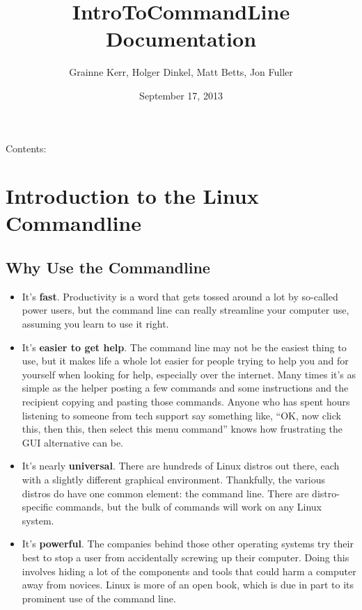 \documentclass[letterpaper,10pt,english]{sphinxmanual}
\title{IntroToCommandLine Documentation}
\date{September 17, 2013}
\author{Grainne Kerr, Holger Dinkel, Matt Betts, Jon Fuller}
\begin{document}
\maketitle
\tableofcontents
{}\label{IntroToCommandLine::doc}


Contents:


\chapter{Introduction to the Linux Commandline}
\label{introduction:welcome-to-introduction-to-the-command-line-for-ngs-documentation}\label{introduction:introduction-to-the-linux-commandline}\label{introduction::doc}

\section{Why Use the Commandline}
\label{introduction:why-use-the-commandline}\begin{itemize}
\item {} 
It's \textbf{fast}. Productivity is a word that gets tossed around a lot by so-called power users, but the command line can really streamline your computer use, assuming you learn to use it right.

\item {} 
It's \textbf{easier to get help}. The command line may not be the easiest thing to use, but it makes life a whole lot easier for people trying to help you and for yourself when looking for help, especially over the internet. Many times it's as simple as the helper posting a few commands and some instructions and the recipient copying and pasting those commands. Anyone who has spent hours listening to someone from tech support say something like, “OK, now click this, then this, then select this menu command” knows how frustrating the GUI alternative can be.

\item {} 
It's nearly \textbf{universal}. There are hundreds of Linux distros out there, each with a slightly different graphical environment. Thankfully, the various distros do have one common element: the command line. There are distro-specific commands, but the bulk of commands will work on any Linux system.

\item {} 
It's \textbf{powerful}. The companies behind those other operating systems try their best to stop a user from accidentally screwing up their computer. Doing this involves hiding a lot of the components and tools that could harm a computer away from novices. Linux is more of an open book, which is due in part to its prominent use of the command line.

\end{itemize}
\end{document}
